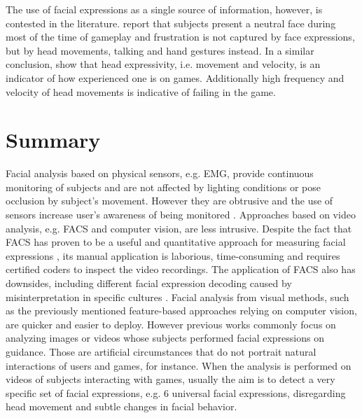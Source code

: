 The use of facial expressions as a single source of information, however, is contested in the literature. \textcite{blom2014towards} report that subjects present a neutral face during most of the time of gameplay and frustration is not captured by face expressions, but by head movements, talking and hand gestures instead. In a similar conclusion, \textcite{shaker2011game} show that head expressivity, i.e. movement and velocity, is an indicator of how experienced one is on games. Additionally high frequency and velocity of head movements is indicative of failing in the game.

\section{Summary}
\label{s:literature-face-summary}

Facial analysis based on physical sensors, e.g. EMG, provide continuous monitoring of subjects and are not affected by lighting conditions or pose occlusion by subject's movement. However they are obtrusive and the use of sensors increase user's awareness of being monitored \parencite{yamakoshi2007preliminary,yamaguchi2006evaluation,healey2005detecting}. Approaches based on video analysis, e.g. FACS and computer vision, are less intrusive. Despite the fact that FACS has proven to be a useful and quantitative approach for measuring facial expressions \parencite{bartlett1999measuring}, its manual application is laborious, time-consuming and requires certified coders to inspect the video recordings. The application of FACS also has downsides, including different facial expression decoding caused by misinterpretation in specific cultures \parencite{jack2013culture}. Facial analysis from visual methods, such as the previously mentioned feature-based approaches relying on computer vision, are quicker and easier to deploy. However previous works commonly focus on analyzing images or videos whose subjects performed facial expressions on guidance. Those are artificial circumstances that do not portrait natural interactions of users and games, for instance. When the analysis is performed on videos of subjects interacting with games, usually the aim is to detect a very specific set of facial expressions, e.g. 6 universal facial expressions, disregarding head movement and subtle changes in facial behavior.

